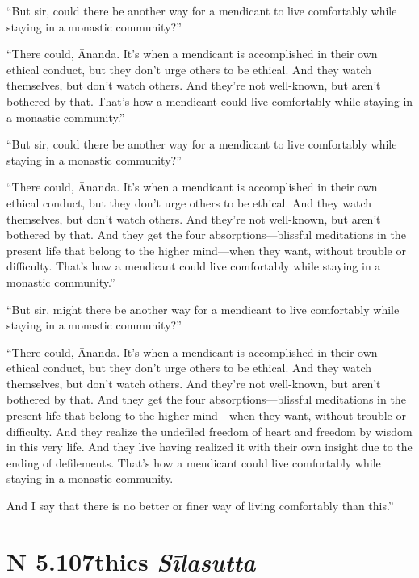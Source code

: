 \documentclass[12pt,openany]{book}%
\newcommand*{\suttatitleacronym}[1]{\smaller[2]{#1}\vspace*{.3em}}
\newcommand*{\suttatitletranslation}[1]{\linebreak{#1}}
\newcommand*{\suttatitleroot}[1]{\linebreak\smaller[2]\itshape{#1}}
\newcommand*{\tocacronym}[1]{\hspace*{-3.3em}{#1}\quad}
\newcommand*{\toctranslation}[1]{#1}
\newcommand*{\tocroot}[1]{(\textit{#1})}
\begin{document}
“But sir, could there be another way for a mendicant to live comfortably while staying in a monastic community?” 

“There could, Ānanda. It’s when a mendicant is accomplished in their own ethical conduct, but they don’t urge others to be ethical. And they watch themselves, but don’t watch others. And they’re not well-known, but aren’t bothered by that. That’s how a mendicant could live comfortably while staying in a monastic community.” 

“But sir, could there be another way for a mendicant to live comfortably while staying in a monastic community?” 

“There could, Ānanda. It’s when a mendicant is accomplished in their own ethical conduct, but they don’t urge others to be ethical. And they watch themselves, but don’t watch others. And they’re not well-known, but aren’t bothered by that. And they get the four absorptions—blissful meditations in the present life that belong to the higher mind—when they want, without trouble or difficulty. That’s how a mendicant could live comfortably while staying in a monastic community.” 

“But sir, might there be another way for a mendicant to live comfortably while staying in a monastic community?” 

“There could, Ānanda. It’s when a mendicant is accomplished in their own ethical conduct, but they don’t urge others to be ethical. And they watch themselves, but don’t watch others. And they’re not well-known, but aren’t bothered by that. And they get the four absorptions—blissful meditations in the present life that belong to the higher mind—when they want, without trouble or difficulty. And they realize the undefiled freedom of heart and freedom by wisdom in this very life. And they live having realized it with their own insight due to the ending of defilements. That’s how a mendicant could live comfortably while staying in a monastic community. 

And I say that there is no better or finer way of living comfortably than this.” 

%
\section*{{\suttatitleacronym AN 5.107}{\suttatitletranslation Ethics }{\suttatitleroot Sīlasutta}}
\addcontentsline{toc}{section}{\tocacronym{AN 5.107} \toctranslation{Ethics } \tocroot{Sīlasutta}}
\end{document}
